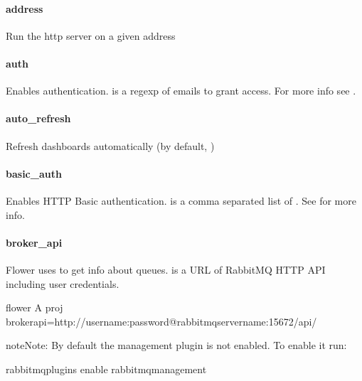 \documentclass[letterpaper,10pt,english]{sphinxmanual}
\begin{document}
\paragraph{address}
\label{\detokenize{config:address}}\label{\detokenize{config:id1}}
Run the http server on a given address


\paragraph{auth}
\label{\detokenize{config:auth}}\label{\detokenize{config:id2}}
Enables authentication.  is a regexp of emails to grant access.
For more info see .


\paragraph{auto\_refresh}
\label{\detokenize{config:auto-refresh}}\label{\detokenize{config:id3}}
Refresh dashboards automatically (by default, )


\paragraph{basic\_auth}
\label{\detokenize{config:basic-auth}}\label{\detokenize{config:id4}}
Enables HTTP Basic authentication.  is a comma separated list
of . See {\hyperref[\detokenize{auth:basic-auth}]{}} for more info.


\paragraph{broker\_api}
\label{\detokenize{config:broker-api}}\label{\detokenize{config:id5}}
Flower uses  to get info about queues.
 is a URL of RabbitMQ HTTP API including user credentials.

\begin{sphinxVerbatim}[commandchars=\\\{\}]
\PYGZdl{} flower \PYGZhy{}A proj \PYGZhy{}\PYGZhy{}broker\PYGZus{}api=http://username:password@rabbitmq\PYGZhy{}server\PYGZhy{}name:15672/api/
\end{sphinxVerbatim}

\begin{sphinxadmonition}{note}{Note:}
By default the management plugin is not enabled. To enable it run:

\begin{sphinxVerbatim}[commandchars=\\\{\}]
\PYGZdl{} rabbitmq\PYGZhy{}plugins enable rabbitmq\PYGZus{}management
\end{sphinxVerbatim}
\end{sphinxadmonition}
\end{document}
